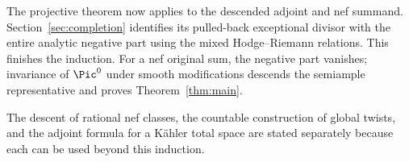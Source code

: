The projective theorem now applies to the descended adjoint and nef
summand. Section~\ref{sec:completion} identifies its pulled-back
exceptional divisor with the entire analytic negative part using
the mixed Hodge--Riemann relations. This finishes the induction.
For a nef original sum, the negative part vanishes; invariance of
\(\Pic^0\) under smooth modifications descends the semiample
representative and proves Theorem~\ref{thm:main}.

The descent of rational nef classes, the countable construction of
global twists, and the adjoint formula for a K\"ahler total space
are stated separately because each can be used beyond this induction.
